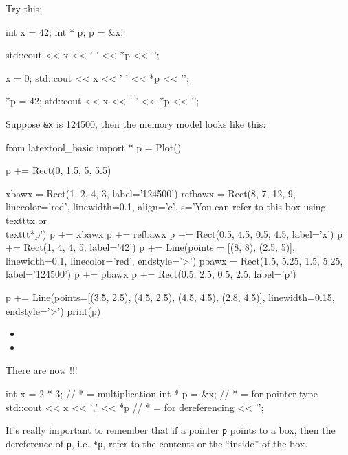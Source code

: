 Try this:

\begin{consolethree}[escapeinside=||]
int x = 42;
int * p;
p = \&x;

std::cout << x << ' ' << *p << '\n';

x = 0;
std::cout << x << ' ' << *p << '\n';

*p = 42;
std::cout << x << ' ' << *p << '\n';
\end{consolethree}
Suppose \texttt{\&x} is 124500, then the memory model looks like this:

\begin{python}
from latextool_basic import *
p = Plot()

p += Rect(0, 1.5, 5, 5.5)

xbawx = Rect(1, 2, 4, 3, label='124500')
refbawx = Rect(8, 7, 12, 9, linecolor='red', linewidth=0.1, align='c', s='You can refer to this box using \\texttt{x} or \\texttt{*p}')
p += xbawx
p += refbawx
p += Rect(0.5, 4.5, 0.5, 4.5, label='x')
p += Rect(1, 4, 4, 5, label='42')
p += Line(points = [(8, 8), (2.5, 5)], linewidth=0.1, linecolor='red', endstyle='>')
pbawx = Rect(1.5, 5.25, 1.5, 5.25, label='124500')
p += pbawx
p += Rect(0.5, 2.5, 0.5, 2.5, label='p')

p += Line(points=[(3.5, 2.5), (4.5, 2.5), (4.5, 4.5), (2.8, 4.5)], linewidth=0.15, endstyle='>')
print(p)
\end{python}



\begin{itemize}
\item
\item
\end{itemize}


There are now !!!

\begin{consolethree}[escapeinside=||]
int x = 2 * 3;           // * = multiplication
int * p = &x;            // * = for pointer type
std::cout << x
          << ',' << *p   // * = for dereferencing
          << '\n';
\end{consolethree}
It's really important to remember that if a pointer \texttt{p} points to a box, then the dereference of \texttt{p}, i.e. \texttt{*p}, refer to the contents or the ``inside'' of the box.

